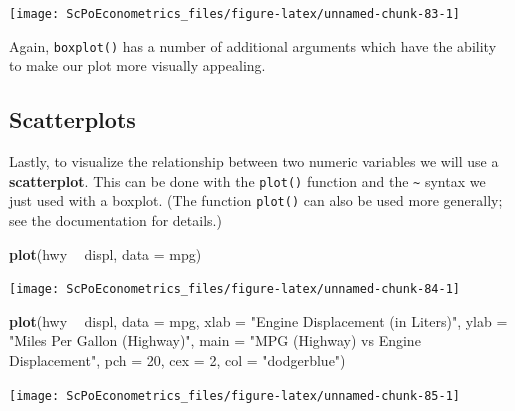 \documentclass[]{book}
\newenvironment{Shaded}{\begin{snugshade}}{\end{snugshade}}
\newcommand{\KeywordTok}[1]{\textcolor[rgb]{0.13,0.29,0.53}{\textbf{#1}}}
\newcommand{\DataTypeTok}[1]{\textcolor[rgb]{0.13,0.29,0.53}{#1}}
\newcommand{\DecValTok}[1]{\textcolor[rgb]{0.00,0.00,0.81}{#1}}
\newcommand{\StringTok}[1]{\textcolor[rgb]{0.31,0.60,0.02}{#1}}
\newcommand{\OperatorTok}[1]{\textcolor[rgb]{0.81,0.36,0.00}{\textbf{#1}}}
\newcommand{\NormalTok}[1]{#1}
\begin{document}
\begin{center}\texttt{[image: ScPoEconometrics\_files/figure-latex/unnamed-chunk-83-1]} \end{center}

Again, \texttt{boxplot()} has a number of additional arguments which
have the ability to make our plot more visually appealing.

\subsection{Scatterplots}\label{scatterplots}

Lastly, to visualize the relationship between two numeric variables we
will use a \textbf{scatterplot}. This can be done with the
\texttt{plot()} function and the \texttt{\textasciitilde{}} syntax we
just used with a boxplot. (The function \texttt{plot()} can also be used
more generally; see the documentation for details.)

\begin{Shaded}
\begin{Highlighting}[]
\KeywordTok{plot}\NormalTok{(hwy }\OperatorTok{~}\StringTok{ }\NormalTok{displ, }\DataTypeTok{data =}\NormalTok{ mpg)}
\end{Highlighting}
\end{Shaded}

\begin{center}\texttt{[image: ScPoEconometrics\_files/figure-latex/unnamed-chunk-84-1]} \end{center}

\begin{Shaded}
\begin{Highlighting}[]
\KeywordTok{plot}\NormalTok{(hwy }\OperatorTok{~}\StringTok{ }\NormalTok{displ, }\DataTypeTok{data =}\NormalTok{ mpg,}
     \DataTypeTok{xlab =} \StringTok{"Engine Displacement (in Liters)"}\NormalTok{,}
     \DataTypeTok{ylab =} \StringTok{"Miles Per Gallon (Highway)"}\NormalTok{,}
     \DataTypeTok{main =} \StringTok{"MPG (Highway) vs Engine Displacement"}\NormalTok{,}
     \DataTypeTok{pch  =} \DecValTok{20}\NormalTok{,}
     \DataTypeTok{cex  =} \DecValTok{2}\NormalTok{,}
     \DataTypeTok{col  =} \StringTok{"dodgerblue"}\NormalTok{)}
\end{Highlighting}
\end{Shaded}

\begin{center}\texttt{[image: ScPoEconometrics\_files/figure-latex/unnamed-chunk-85-1]} \end{center}
\end{document}
